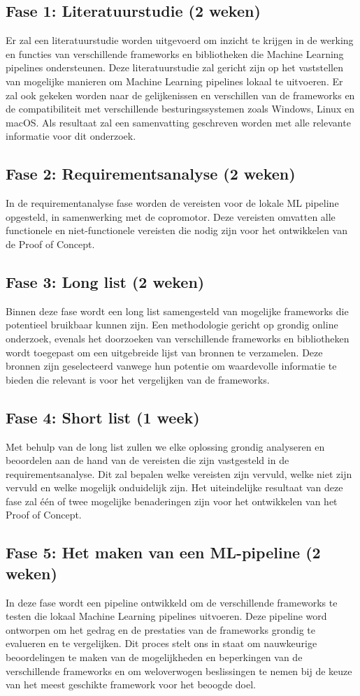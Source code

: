 \subsection{Fase 1: Literatuurstudie (2 weken)}
Er zal een literatuurstudie worden uitgevoerd om inzicht te krijgen in de werking en
functies van verschillende frameworks en bibliotheken die Machine Learning pipelines ondersteunen.
Deze literatuurstudie zal gericht zijn op het vaststellen van mogelijke manieren om Machine Learning pipelines lokaal te uitvoeren. Er zal ook gekeken worden naar de gelijkenissen en verschillen van de frameworks en de compatibiliteit met verschillende besturingssystemen zoals Windows, Linux en macOS.
Als resultaat zal een samenvatting geschreven worden met alle relevante informatie voor dit onderzoek.
\subsection{Fase 2: Requirementsanalyse (2 weken)}
In de requirementanalyse fase worden de vereisten voor de lokale ML pipeline opgesteld, in samenwerking met de copromotor. Deze vereisten omvatten alle functionele en niet-functionele vereisten die nodig zijn voor het ontwikkelen van de Proof of Concept.

\subsection{Fase 3: Long list (2 weken)}
Binnen deze fase wordt een long list samengesteld van mogelijke frameworks die potentieel bruikbaar kunnen zijn. Een methodologie gericht op grondig online onderzoek, evenals het doorzoeken van verschillende frameworks en bibliotheken wordt toegepast om een uitgebreide lijst van bronnen te verzamelen. Deze bronnen zijn geselecteerd vanwege hun potentie om waardevolle informatie te bieden die relevant is voor het vergelijken van de frameworks.
\subsection{Fase 4: Short list (1 week)}
Met behulp van de long list zullen we elke oplossing grondig analyseren en beoordelen aan de hand van de vereisten die zijn vastgesteld in de requirementsanalyse. Dit zal bepalen welke vereisten zijn vervuld, welke niet zijn vervuld en welke mogelijk onduidelijk zijn. Het uiteindelijke resultaat van deze fase zal één of twee mogelijke benaderingen zijn voor het ontwikkelen van het Proof of Concept.
\subsection{Fase 5: Het maken van een ML-pipeline (2 weken)}
In deze fase wordt een pipeline ontwikkeld om de verschillende frameworks te testen die lokaal Machine Learning pipelines uitvoeren. Deze pipeline word ontworpen om het gedrag en de prestaties van de frameworks grondig te evalueren en te vergelijken. Dit proces stelt ons in staat om nauwkeurige beoordelingen te maken van de mogelijkheden en beperkingen van de verschillende frameworks en om weloverwogen beslissingen te nemen bij de keuze van het meest geschikte framework voor het beoogde doel.
